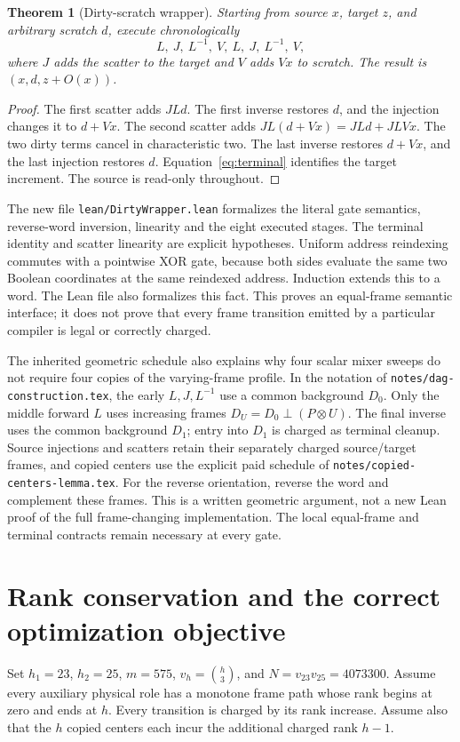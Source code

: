 \documentclass[11pt]{article}
\newtheorem{theorem}{Theorem}
\begin{document}
\begin{theorem}[Dirty-scratch wrapper]
Starting from source $x$, target $z$, and arbitrary scratch $d$, execute
chronologically
\[
 L,\ J,\ L^{-1},\ V,\ L,\ J,\ L^{-1},\ V,
\]
where $J$ adds the scatter to the target and $V$ adds $Vx$ to scratch.
The result is $(x,d,z+O(x))$.
\end{theorem}
\begin{proof}
The first scatter adds $JLd$. The first inverse restores $d$, and the
injection changes it to $d+Vx$. The second scatter adds
$JL(d+Vx)=JLd+JLVx$. The two dirty terms cancel in characteristic two.
The last inverse restores $d+Vx$, and the last injection restores $d$.
Equation~\eqref{eq:terminal} identifies the target increment. The source is
read-only throughout.
\end{proof}

The new file \texttt{lean/DirtyWrapper.lean} formalizes the literal gate
semantics, reverse-word inversion, linearity and the eight executed stages.
The terminal identity and scatter linearity are explicit hypotheses.
Uniform address reindexing commutes with a pointwise XOR gate, because both
sides evaluate the same two Boolean coordinates at the same reindexed address.
Induction extends this to a word. The Lean file also formalizes this fact.
This proves an equal-frame semantic interface; it does not prove that every
frame transition emitted by a particular compiler is legal or correctly charged.

The inherited geometric schedule also explains why four scalar mixer sweeps
do not require four copies of the varying-frame profile. In the notation of
\texttt{notes/dag-construction.tex}, the early $L,J,L^{-1}$ use a common
background $D_0$. Only the middle forward $L$ uses increasing frames
$D_U=D_0\perp(P\otimes U)$. The final inverse uses the common background
$D_1$; entry into $D_1$ is charged as terminal cleanup. Source injections
and scatters retain their separately charged source/target frames, and copied
centers use the explicit paid schedule of \texttt{notes/copied-centers-lemma.tex}.
For the reverse orientation, reverse the word and complement these frames.
This is a written geometric argument, not a new Lean proof of the full
frame-changing implementation. The local equal-frame and terminal contracts
remain necessary at every gate.

\section{Rank conservation and the correct optimization objective}
Set $h_1=23$, $h_2=25$, $m=575$, $v_h=\binom h3$, and
$N=v_{23}v_{25}=4073300$. Assume every auxiliary physical role has a
monotone frame path whose rank begins at zero and ends at $h$.
Every transition is charged by its rank increase. Assume also that the $h$
copied centers each incur the additional charged rank $h-1$.
\end{document}
